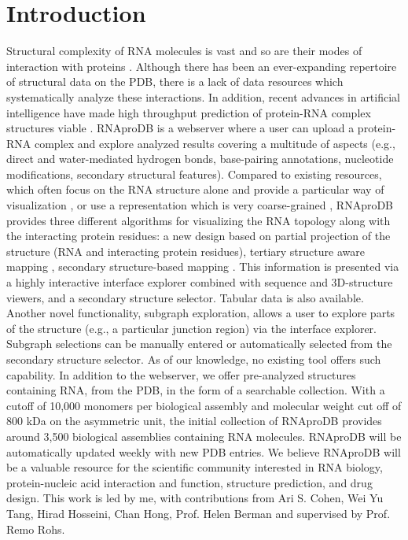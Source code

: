 \section{Introduction}
Structural complexity of RNA molecules is vast and so are their modes of interaction with proteins \citep{jones2001protein}. Although there has been an ever-expanding repertoire of structural data on the PDB, there is a lack of data resources which systematically analyze these interactions. In addition, recent advances in artificial intelligence have made high throughput prediction of protein-RNA complex structures viable \citep{Abramson2024, watson2023novo}. RNAproDB is a webserver where a user can upload a protein-RNA complex and explore analyzed results covering a multitude of aspects (e.g., direct and water-mediated hydrogen bonds, base-pairing annotations, nucleotide modifications, secondary structural features). Compared to existing resources, which often focus on the RNA structure alone and provide a particular way of visualization \citep{Kerpedjiev2015, Yang2003}, or use a representation which is very coarse-grained \citep{chojnowski2014rna}, RNAproDB provides three different algorithms for visualizing the RNA topology along with the interacting protein residues: a new design based on partial projection of the structure (RNA and interacting protein residues), tertiary structure aware mapping \citep{Mitra2024rnascape}, secondary structure-based mapping \citep{Kerpedjiev2015}. This information is presented via a highly interactive interface explorer combined with sequence and 3D-structure viewers, and a secondary structure selector. Tabular data is also available. Another novel functionality, subgraph exploration, allows a user to explore parts of the structure (e.g., a particular junction region) via the interface explorer. Subgraph selections can be manually entered or automatically selected from the secondary structure selector. As of our knowledge, no existing tool offers such capability. In addition to the webserver, we offer pre-analyzed structures containing RNA, from the PDB, in the form of a searchable collection. With a cutoff of 10,000 monomers per biological assembly and molecular weight cut off of 800 kDa on the asymmetric unit, the initial collection of RNAproDB provides around 3,500 biological assemblies containing RNA molecules. RNAproDB will be automatically updated weekly with new PDB entries. We believe RNAproDB will be a valuable resource for the scientific community interested in RNA biology, protein-nucleic acid interaction and function, structure prediction, and drug design. This work is led by me, with contributions from Ari S. Cohen, Wei Yu Tang, Hirad Hosseini, Chan Hong, Prof. Helen Berman and supervised by Prof. Remo Rohs.

